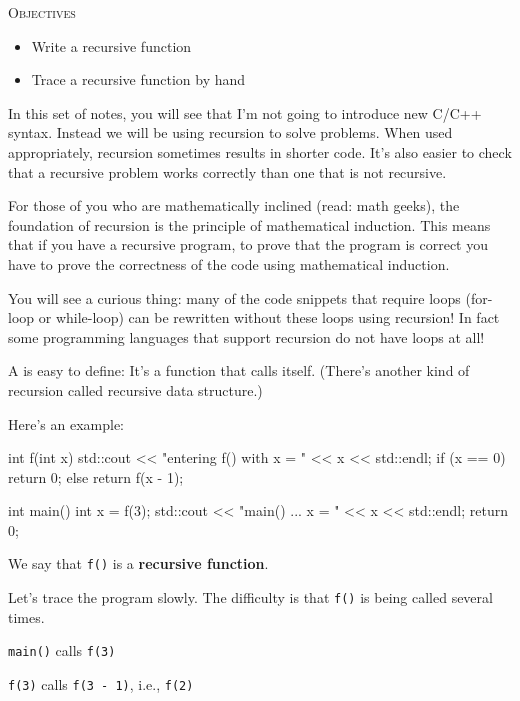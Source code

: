 \newpage{}

\textsc{Objectives}
\begin{itemize}
\item Write a recursive function
\item Trace a recursive function by hand
\end{itemize}

In this set of notes, you will see that I'm not going to introduce new
C/C++ syntax. Instead we will be using recursion to solve problems. When
used appropriately, recursion sometimes results in shorter code.
It's also easier to check that a recursive problem works
correctly than one that is not recursive.

For those of you who are mathematically inclined (read: math geeks), the
foundation of recursion is the principle of mathematical induction. This
means that if you have a recursive program, to prove that the program is
correct you have to prove the correctness of the code using mathematical
induction.

You will see a curious thing: many of the code snippets that require
loops (for-loop or while-loop) can be rewritten without these loops
using recursion! In fact some programming languages that support
recursion do not have loops at all!


\newpage{}

A  is easy to define:
It's a function that calls itself.
(There's another kind of recursion called recursive data
structure.)

Here's an example:

\begin{consolethree}[escapeinside=||]
int f(int x)
{
    std::cout << "entering f() with x = " << x
              << std::endl;
    if (x == 0)
    {
        return 0;
    }
    else
    {
        return f(x - 1);
    }
}

int main()
{
    int x = f(3);
    std::cout << "main() ... x = " << x << std::endl;
    return 0;
}
\end{consolethree}

We say that \texttt{f()} is a \textbf{recursive function}.

Let's trace the program slowly. The difficulty is that
\texttt{f()} is being called several times.

\texttt{main()} calls \texttt{f(3)}

\texttt{f(3)} calls \texttt{f(3 - 1)}, i.e., \texttt{f(2)}

